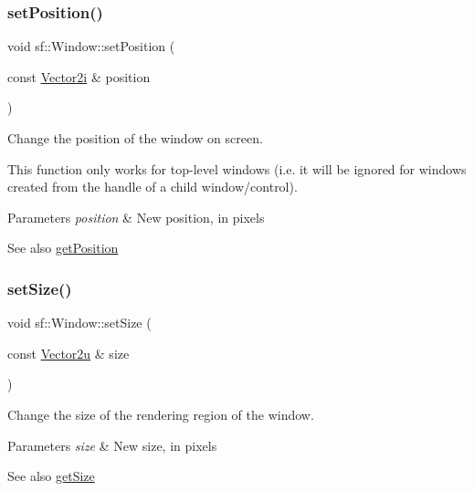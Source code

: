 \subsubsection{\texorpdfstring{set\+Position()}{setPosition()}}
{\footnotesize\ttfamily void sf\+::\+Window\+::set\+Position (\begin{DoxyParamCaption}\item[{const \hyperlink{classsf_1_1_vector2}{Vector2i} \&}]{position }\end{DoxyParamCaption})}



Change the position of the window on screen. 

This function only works for top-\/level windows (i.\+e. it will be ignored for windows created from the handle of a child window/control).


\begin{DoxyParams}{Parameters}
{\em position} & New position, in pixels\\
\hline
\end{DoxyParams}
\begin{DoxySeeAlso}{See also}
\hyperlink{classsf_1_1_window_a420028b8e4d9baedcaaba7b2047b8cb3}{get\+Position} 
\end{DoxySeeAlso}
\mbox{\label{classsf_1_1_window_ab94ea32f22d15c0df11588e319de2546}} 
\subsubsection{\texorpdfstring{set\+Size()}{setSize()}}
{\footnotesize\ttfamily void sf\+::\+Window\+::set\+Size (\begin{DoxyParamCaption}\item[{const \hyperlink{classsf_1_1_vector2}{Vector2u} \&}]{size }\end{DoxyParamCaption})}



Change the size of the rendering region of the window. 


\begin{DoxyParams}{Parameters}
{\em size} & New size, in pixels\\
\hline
\end{DoxyParams}
\begin{DoxySeeAlso}{See also}
\hyperlink{classsf_1_1_window_a3969926741cbe83d7f9eeaf5333d4e71}{get\+Size} 
\end{DoxySeeAlso}
\mbox{\label{classsf_1_1_window_a3b3f3513bb6be90f5cd456c20b5fd5fa}} 
